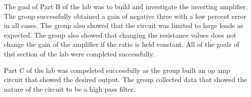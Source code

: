 \documentclass[twocolumn, amsmath]{revtex4}
\begin{document}
The goal of Part B of the lab was to build and investigate the inverting amplifier. The group successfully obtained a gain of negative three with a low percent error in all cases. The group also showed that the circuit was limited to large loads as expected. The group also showed that changing the resistance values does not change the gain of the amplifier if the ratio is held constant. All of the goals of thsi section of the lab were completed successfully.

Part C of the lab was compeleted successfully as the group built an op amp circuit that showed the desired output. The group collected data that showed the nature of the circuit to be a high pass filter.
\end{document}
